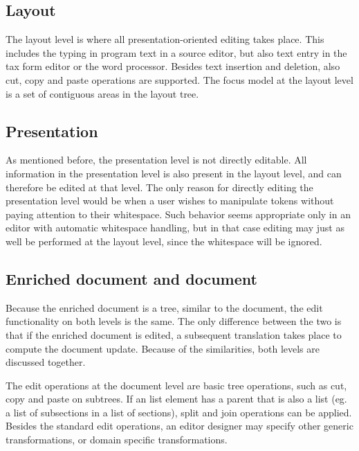 \subsection{Layout}

The layout level is where all presentation-oriented editing takes place. This includes the typing in program text in a source editor, but also text entry in the tax form editor or the word processor. Besides text insertion and deletion, also cut, copy and paste operations are supported. The focus model at the layout level is a set of contiguous areas in the layout tree.

\subsection{Presentation}

As mentioned before, the presentation level is not directly editable. All information in the presentation level is also present in the layout level, and can therefore be edited at that level. The only reason for directly editing the presentation level would be when a user wishes to manipulate tokens without paying attention to their whitespace. Such behavior seems appropriate only in an editor with automatic whitespace handling, but in that case editing may just as well be performed at the layout level, since the whitespace will be ignored. 

\subsection{Enriched document and document}

Because the enriched document is a tree, similar to the document, the edit functionality on both levels is the same. The only difference between the two is that if the enriched document is edited, a subsequent translation takes place to compute the document update. Because of the similarities, both levels are discussed together.

The edit operations at the document level are basic tree operations, such as cut, copy and paste on subtrees. If an list element has a parent that is also a list (eg. a list of subsections in a list of sections), split and join operations can be applied. Besides the standard edit operations, an editor designer may specify other generic transformations, or domain specific transformations. 

